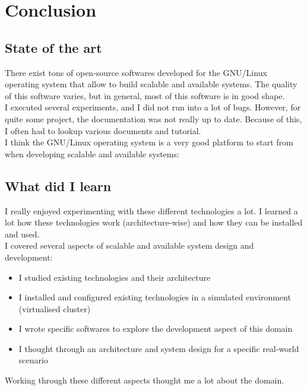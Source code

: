\documentclass[12pt]{report}
\begin{document}
\chapter{Conclusion} %
\section{State of the art}
There exist tons of open-source softwares developed for the GNU/Linux 
operating system that allow to build scalable and available systems.
The quality of this software varies, but in general, most of this
software is in good shape. \\
I executed several experiments, and I did not run into a lot of
bugs. However, for quite some project, the documentation was not
really up to date. Because of this, I often had to lookup various
documents and tutorial.\\
I think the GNU/Linux operating system is a very good platform to
start from when developing scalable and available systems: 

\section{What did I learn}
I really enjoyed experimenting with these different technologies a lot. I
learned a lot how these technologies work (architecture-wise) and how
they can be installed and used.\\
I covered several aspects of scalable and available system design and
development: 
\begin{itemize}
\item I studied existing technologies and their architecture
\item I installed and configured existing technologies in a simulated
  environment (virtualised cluster)
\item I wrote specific softwares to explore the development aspect of
  this domain
\item I thought through an architecture and system design for a
  specific real-world scenario
\end{itemize}
Working through these different aspects thought me a lot about the
domain. 
\end{document}

